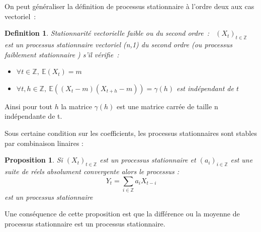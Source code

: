 \documentclass[11pt]{scrartcl} %
\newtheorem{Def}[theorem]{Definition}
\newtheorem{pro}[theorem]{Proposition}
\newcommand{\Xt}{\left(X_t\right)_{t\in\mathbb{Z}}}
\newcommand{\E}[1]{\mathbb{E}\left(#1\right)}
\begin{document}
On peut généraliser la définition de processus stationnaire à l'ordre deux aux cas vectoriel~:
\begin{Def}\label{staFaibleVec}
Stationnarité vectorielle faible ou du second ordre~:~
$\left(X_t\right)_{t\in\mathbb{Z}}$ est un processus stationnaire vectoriel (n,1) du second ordre (ou processus faiblement stationnaire ) s'il vérifie~:
\begin{itemize}
\item[i)]$\forall t\in\mathbb{Z},~\mathbb{E}\left(X_t\right)=m $ 
\item[ii)]$\forall t,h\in\mathbb{Z},~\E{(X_t-m)(X_{t+h}-m)}=\gamma\left(h\right) $ est indépendant de $t$ 
\end{itemize}
\end{Def} 
Ainsi pour tout $h$ la matrice $\gamma(h)$ est une matrice carrée de taille n indépendante de t.

 

Sous certaine condition sur les coefficients, les processus stationnaires sont stables par combinaison linaires : 
\begin{pro}
Si $\Xt$ est un processus stationnaire et $(a_i)_{i\in \mathbb{Z}}$ est une suite de réels absolument convergente alors le processus : 
$$
Y_t=\sum_{i\in\mathbb{Z}}a_i X_{t-i}
$$
est un processus stationnaire
\end{pro}
Une conséquence de cette proposition est que la différence ou la moyenne de processus stationnaire est un processus stationnaire.
\end{document}
